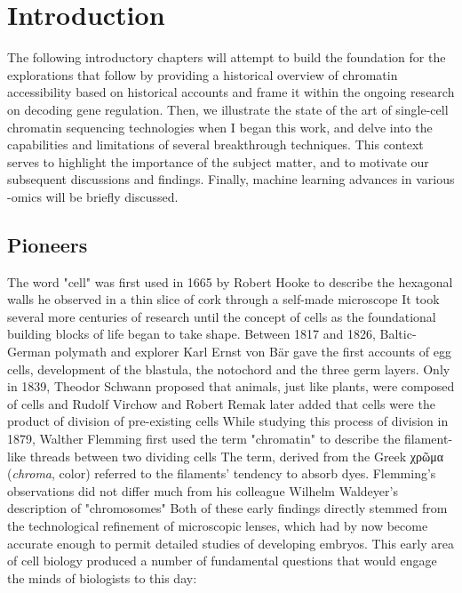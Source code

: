 \chapter{\nohyphens{Introduction}}
The following introductory chapters will attempt to build the foundation for the explorations that follow by providing a historical overview of chromatin accessibility based on historical accounts and frame it within the ongoing research on decoding gene regulation. Then, we illustrate the state of the art of single-cell chromatin sequencing technologies when I began this work, and delve into the capabilities and limitations of several breakthrough techniques. This context serves to highlight the importance of the subject matter, and to motivate our subsequent discussions and findings. Finally, machine learning advances in various -omics will be briefly discussed.

\section{Pioneers}
\label{sect:early}
The word "cell" was first used in 1665 by Robert Hooke to describe the hexagonal walls he observed in a thin slice of cork through a self-made microscope It took several more centuries of research until the concept of cells as the foundational building blocks of life began to take shape. Between 1817 and 1826, Baltic-German polymath and explorer Karl Ernst von B\"{a}r gave the first accounts of egg cells, development of the blastula, the notochord and the three germ layers. Only in 1839, Theodor Schwann proposed that animals, just like plants, were composed of cells and Rudolf Virchow and Robert Remak later added that cells were the product of division of pre-existing cells While studying this process of division in 1879, Walther Flemming first used the term "chromatin" to describe the filament-like threads between two dividing cells The term, derived from the Greek {\greekfont χρῶμ{\greekfont α}} (\textit{chroma}, color) referred to the filaments' tendency to absorb dyes. Flemming's observations did not differ much from his colleague Wilhelm Waldeyer's description of "chromosomes" Both of these early findings directly stemmed from the technological refinement of microscopic lenses, which had by now become accurate enough to permit detailed studies of developing embryos. This early area of cell biology produced a number of fundamental questions that would engage the minds of biologists to this day:


